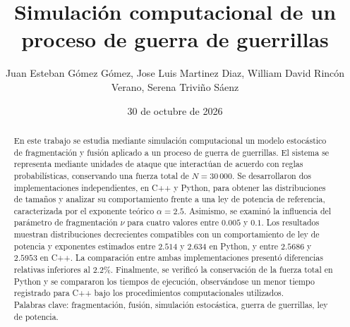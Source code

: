 \documentclass[
a4paper,
amsfonts,
amssymb,
amsmath,
reprint,
twoside
]{revtex4-1}
\begin{document}

\title{
Simulación computacional de un proceso de guerra de guerrillas
}


\author{
Juan Esteban Gómez Gómez, Jose Luis Martinez Diaz, William David Rincón Verano, Serena Triviño Sáenz
}


\date{30 de octubre de 2026}


\begin{abstract}

En este trabajo se estudia mediante simulación computacional un
modelo estocástico de fragmentación y fusión aplicado a un proceso
de guerra de guerrillas. El sistema se representa mediante unidades
de ataque que interactúan de acuerdo con reglas probabilísticas,
conservando una fuerza total de $N=30\,000$. Se desarrollaron dos
implementaciones independientes, en C++ y Python, para obtener
las distribuciones de tamaños y analizar su comportamiento frente
a una ley de potencia de referencia, caracterizada por el exponente
teórico $\alpha=2.5$. Asimismo, se examinó la influencia del
parámetro de fragmentación $\nu$ para cuatro valores entre
$0.005$ y $0.1$. Los resultados muestran distribuciones decrecientes
compatibles con un comportamiento de ley de potencia y exponentes
estimados entre $2.514$ y $2.634$ en Python, y entre $2.5686$
y $2.5953$ en C++. La comparación entre ambas implementaciones
presentó diferencias relativas inferiores al $2.2\%$. Finalmente,
se verificó la conservación de la fuerza total en Python y se
compararon los tiempos de ejecución, observándose un menor tiempo
registrado para C++ bajo los procedimientos computacionales
utilizados.\\

Palabras clave: fragmentación, fusión,
simulación estocástica, guerra de guerrillas, ley de potencia.
\end{abstract}

\maketitle
\end{document}
